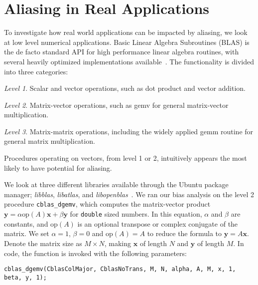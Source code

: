 \documentclass{acm_proc_article-sp}
\begin{document}
\section{Aliasing in Real Applications}
\label{sec:blas}
To investigate how real world applications can be impacted by aliasing, we look at low level numerical applications.
Basic Linear Algebra Subroutines (BLAS) is the de facto standard API for high performance linear algebra routines, with several heavily optimized implementations available~\cite{Blackford:2002:UpdatedBLAS}.
The functionality is divided into three categories:
\begin{list}{{}}
  \item[\emph{Level 1}.] Scalar and vector operations, such as dot product and vector addition.
  \item[\emph{Level 2}.] Matrix-vector operations, such as gemv for general matrix-vector multiplication.
  \item[\emph{Level 3}.] Matrix-matrix operations, including the widely applied gemm routine for general matrix multiplication.
\end{list}
Procedures operating on vectors, from level 1 or 2, intuitively appears the most likely to have potential for aliasing.

We look at three different libraries available through the Ubuntu package manager; \emph{libblas}, \emph{libatlas}, and \emph{libopenblas}~\cite{Whaley:1998:ATLAS,Wang:2013:OpenBLAS}.
We ran our bias analysis on the level 2 procedure \texttt{cblas\_dgemv}, which computes the matrix-vector product $\boldsymbol{y} = \alpha\text{op}\left(A\right)\boldsymbol{x} + \beta\boldsymbol{y}$ for \texttt{double} sized numbers.
In this equation,  $\alpha$ and $\beta$ are constants, and $\text{op}\left(A\right)$ is an optional transpose or complex conjugate of the matrix.
We set $\alpha = 1$, $\beta = 0$ and $\text{op} \left(A\right) = A$ to reduce the formula to $\boldsymbol{y}=A\boldsymbol{x}$.
Denote the matrix size as $M \times N$, making $\boldsymbol{x}$ of length $N$ and $\boldsymbol{y}$ of length $M$.
In code, the function is invoked with the following parameters:
\begin{lstlisting}
cblas_dgemv(CblasColMajor, CblasNoTrans, M, N, alpha, A, M, x, 1, beta, y, 1);
\end{lstlisting}
\end{document}
